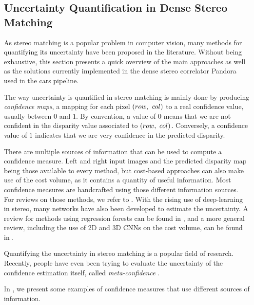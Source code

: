 \subsection{Uncertainty Quantification in Dense Stereo Matching}\label{sec:uncertainty_pandora}
As stereo matching is a popular problem in computer vision, many methods for quantifying its uncertainty have been proposed in the literature. Without being exhaustive, this section presents a quick overview of the main approaches as well as the solutions currently implemented in the dense stereo correlator Pandora used in the \acrshort{cars} pipeline.

The way uncertainty is quantified in stereo matching is mainly done by producing \textit{confidence maps}, \ie a mapping for each pixel $(row, ~col)$ to a real confidence value, usually between $0$ and $1$. By convention, a value of $0$ means that we are not confident in the disparity value associated to $(row, ~col)$. Conversely, a confidence value of $1$ indicates that we are very confidence in the predicted disparity.

There are multiple sources of information that can be used to compute a confidence measure. Left and right input images and the predicted disparity map being those available to every method, but cost-based approaches can also make use of the cost volume, as it contains a quantity of useful information. Most confidence measures are handcrafted using those different information sources. For reviews on those methods, we refer to \cite{egnal_stereo_2004, hu_quantitative_2012, poggi_quantitative_2017}. With the rising use of deep-learning in stereo, many networks have also been developed to estimate the uncertainty. A review for methods using regression forests can be found in \cite{min-gyu_park_leveraging_2015}, and a more general review, including the use of 2D and 3D CNNs on the cost volume, can be found in \cite{poggi_confidence_2021}.

\begin{remark}
     Quantifying the uncertainty in stereo matching is a popular field of research. Recently, people have even been trying to evaluate the uncertainty of the confidence estimation itself, called \textit{meta-confidence} \cite{kim_meta-confidence_2022}.
\end{remark}

In , we present some examples of confidence measures that use different sources of information.

